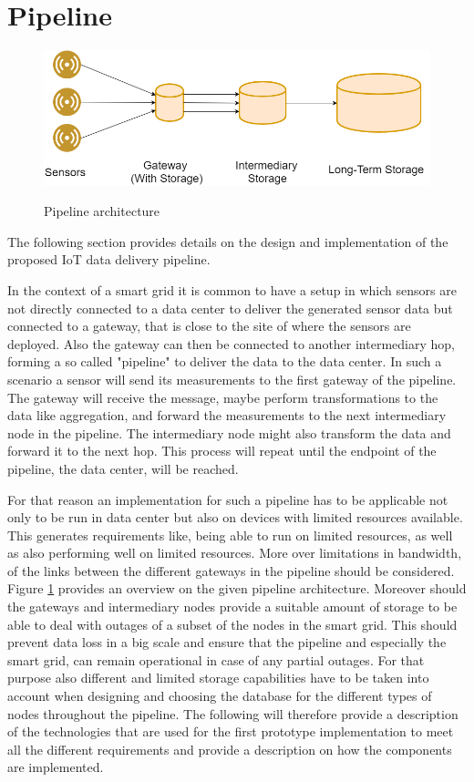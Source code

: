 \section{Pipeline}

\begin{figure}[h]
\centering
\includegraphics[width=\textwidth]{figures/pipeline.png}\\
\caption{Pipeline architecture}
\label{pipeline}
\end{figure}
The following section provides details on the design and implementation of the proposed IoT data delivery pipeline. 

In the context of a smart grid it is common to have a setup in which sensors are not directly connected to a data center to deliver the generated sensor data but connected to a gateway, that is close to the site of where the sensors are deployed. Also the gateway can then be connected to another intermediary hop, forming a so called "pipeline" to deliver the data to the data center. In such a scenario a sensor will send its measurements to the first gateway of the pipeline. The gateway will receive the message, maybe perform transformations to the data like aggregation, and forward the measurements to the next intermediary node in the pipeline. The intermediary node might also transform the data and forward it to the next hop. This process will repeat until the endpoint of the pipeline, the data center, will be reached. 

For that reason an implementation for such a pipeline has to be applicable not only to be run in data center but also on devices with limited resources available. This generates requirements like, being able to run on limited resources, as well as also performing well on limited resources. More over limitations in bandwidth, of the links between the different gateways in the pipeline should be considered.
Figure \ref{pipeline} provides an overview on the given pipeline architecture. Moreover should the gateways and intermediary nodes provide a suitable amount of storage to be able to deal with outages of a subset of the nodes in the smart grid. This should prevent data loss in a big scale and ensure that the pipeline and especially the smart grid, can remain operational in case of any partial outages. For that purpose also different and limited storage capabilities have to be taken into account when designing and choosing the database for the different types of nodes throughout the pipeline. The following will therefore provide a description of the technologies that are used for the first prototype implementation to meet all the different requirements and provide a description on how the components are implemented.

